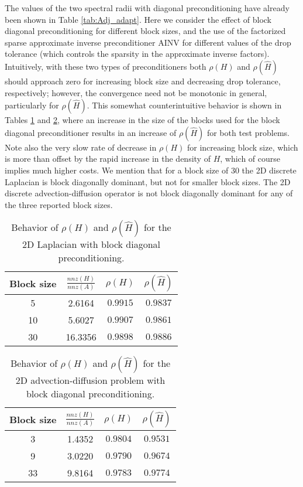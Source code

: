 \documentclass[final,leqno,onefignum,onetabnum]{siamltex1213}
\begin{document}
The values of the two spectral radii with
diagonal preconditioning have already been shown in Table
\ref{tab:Adj_adapt}.
Here we consider the effect of
block diagonal preconditioning for different block sizes,
and the use of the factorized sparse approximate inverse
preconditioner AINV \cite{BMT1996,BT1998}
for different values of the drop tolerance (which controls the
sparsity in the approximate inverse factors).
Intuitively, with these two types of preconditioners both $\rho(H)$ and $\rho(\hat{H})$
should approach zero for increasing block size and decreasing
drop tolerance, respectively; however, the convergence need
not be monotonic in general, particularly for $\rho(\hat{H})$.
This somewhat counterintuitive
behavior is shown in Tables \ref{tab:lap2d_block} and \ref{tab:ifiss_block},
where an increase in the size of the blocks used for the block diagonal
preconditioner results in an increase of $\rho(\hat{H})$ for both test problems.
Note also the very slow rate of decrease in $\rho(H)$ for increasing block
size, which is more than offset by the rapid increase in the density of $H$,
which of course implies much higher costs.
We mention that for a block size of 30 the 2D discrete Laplacian is
block diagonally dominant, but not for smaller block sizes. The 2D
discrete advection-diffusion operator is not block diagonally dominant
for any of the three reported block sizes.


\begin{table}[!t]
\centering
\begin{tabular}{|c|c|c|c|}
\hline
\textbf{Block size} & \textbf{$\frac{nnz(H)}{nnz(A)}$}& $\rho(H)$
&$\rho(\hat{H})$\\
\hline
 5 & 2.6164 & $0.9915$ & $0.9837$\\
\hline
 10 & 5.6027 & $0.9907$ & $0.9861$\\
\hline
 30 & 16.3356 & $0.9898$  & $0.9886$\\
\hline
\end{tabular}
\caption{Behavior of $\rho(H)$ and $\rho(\hat{H})$ for the
2D Laplacian with block diagonal preconditioning.}
\label{tab:lap2d_block}
\end{table}


\begin{table}[!t]
\centering
\begin{tabular}{|c|c|c|c|}
\hline
\textbf{Block size} & \textbf{$\frac{nnz(H)}{nnz(A)}$}& $\rho(H)$
&$\rho(\hat{H})$\\
\hline
 3 & 1.4352 & $0.9804$ & $0.9531$\\
\hline
 9 & 3.0220 & $0.9790$ & $0.9674$\\
\hline
 33 & 9.8164 & $0.9783$  & $0.9774$\\
\hline
\end{tabular}
\caption{Behavior of $\rho(H)$ and $\rho(\hat{H})$ for the
2D advection-diffusion problem with block diagonal preconditioning.}
\label{tab:ifiss_block}
\end{table}
\end{document}
